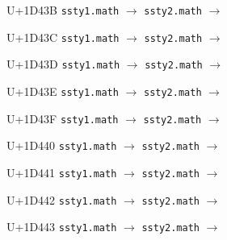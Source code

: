 \documentclass{article}
\begin{document}
\begin{substitutions}
\goodbreak

U+1D43B  \linebreak
    \texttt{ssty1.math} $\to$  \linebreak
    \texttt{ssty2.math} $\to$  

\goodbreak

U+1D43C  \linebreak
    \texttt{ssty1.math} $\to$  \linebreak
    \texttt{ssty2.math} $\to$  

\goodbreak

U+1D43D  \linebreak
    \texttt{ssty1.math} $\to$  \linebreak
    \texttt{ssty2.math} $\to$  

\goodbreak

U+1D43E  \linebreak
    \texttt{ssty1.math} $\to$  \linebreak
    \texttt{ssty2.math} $\to$  

\goodbreak

U+1D43F  \linebreak
    \texttt{ssty1.math} $\to$  \linebreak
    \texttt{ssty2.math} $\to$  

\goodbreak

U+1D440  \linebreak
    \texttt{ssty1.math} $\to$  \linebreak
    \texttt{ssty2.math} $\to$  

\goodbreak

U+1D441  \linebreak
    \texttt{ssty1.math} $\to$  \linebreak
    \texttt{ssty2.math} $\to$  

\goodbreak

U+1D442  \linebreak
    \texttt{ssty1.math} $\to$  \linebreak
    \texttt{ssty2.math} $\to$  

\goodbreak

U+1D443  \linebreak
    \texttt{ssty1.math} $\to$  \linebreak
    \texttt{ssty2.math} $\to$  


\end{substitutions}
\end{document}
